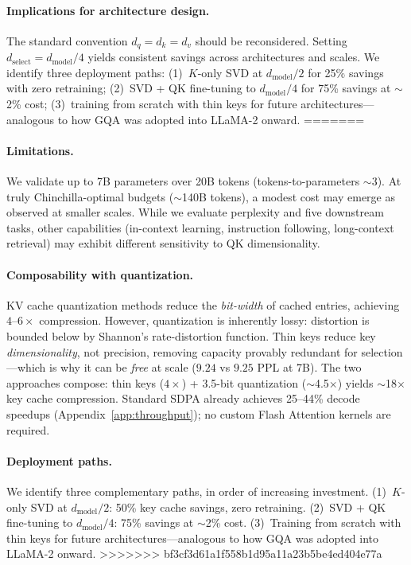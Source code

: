 \documentclass{article} %
\newcommand{\dmodel}{d_{\text{model}}}
\newcommand{\dselect}{d_{\text{select}}}
\begin{document}
\paragraph{Implications for architecture design.}
The standard convention $d_q = d_k = d_v$ should be reconsidered. Setting $\dselect = \dmodel / 4$ yields consistent savings across architectures and scales. We identify three deployment paths: (1)~$K$-only SVD at $\dmodel/2$ for 25\% savings with zero retraining; (2)~SVD + QK fine-tuning to $\dmodel/4$ for 75\% savings at $\sim$2\% cost; (3)~training from scratch with thin keys for future architectures---analogous to how GQA was adopted into LLaMA-2 onward.
=======
\paragraph{Limitations.}
We validate up to 7B parameters over 20B tokens (tokens-to-parameters $\sim$3). At truly Chinchilla-optimal budgets ($\sim$140B tokens), a modest cost may emerge as observed at smaller scales. While we evaluate perplexity and five downstream tasks, other capabilities (in-context learning, instruction following, long-context retrieval) may exhibit different sensitivity to QK dimensionality.

\paragraph{Composability with quantization.}
KV cache quantization methods \citep{gao2024rabitq, zandieh2025turboquant, liu2024kivi, zandieh2024qjl} reduce the \emph{bit-width} of cached entries, achieving $4$--$6\times$ compression. However, quantization is inherently lossy: distortion is bounded below by Shannon's rate-distortion function. Thin keys reduce key \emph{dimensionality}, not precision, removing capacity provably redundant for selection---which is why it can be \emph{free} at scale ($9.24$ vs $9.25$ PPL at 7B). The two approaches compose: thin keys ($4\times$) + 3.5-bit quantization ($\sim$4.5$\times$) yields $\sim$18$\times$ key cache compression. Standard SDPA already achieves 25--44\% decode speedups (Appendix~\ref{app:throughput}); no custom Flash Attention kernels are required.

\paragraph{Deployment paths.}
We identify three complementary paths, in order of increasing investment.
(1)~$K$-only SVD at $\dmodel/2$: 50\% key cache savings, zero retraining. (2)~SVD + QK fine-tuning to $\dmodel/4$: 75\% savings at $\sim$2\% cost. (3)~Training from scratch with thin keys for future architectures---analogous to how GQA was adopted into LLaMA-2 onward.
>>>>>>> bf3cf3d61a1f558b1d95a11a23b5be4ed404e77a
\end{document}
